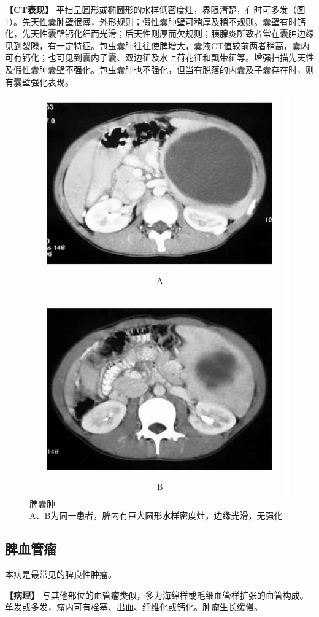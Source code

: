 \textbf{【CT表现】}
平扫呈圆形或椭圆形的水样低密度灶，界限清楚，有时可多发（图\ref{fig14-6}）。先天性囊肿壁很薄，外形规则；假性囊肿壁可稍厚及稍不规则。囊壁有时钙化，先天性囊壁钙化细而光滑；后天性则厚而欠规则；胰腺炎所致者常在囊肿边缘见到裂隙，有一定特征。包虫囊肿往往使脾增大，囊液CT值较前两者稍高，囊内可有钙化；也可见到囊内子囊、双边征及水上荷花征和飘带征等。增强扫描先天性及假性囊肿囊壁不强化。包虫囊肿也不强化，但当有脱落的内囊及子囊存在时，则有囊壁强化表现。

\begin{figure}[!htbp]
 \centering
 \includegraphics[width=.7\textwidth,height=\textheight,keepaspectratio]{./images/Image00314.jpg}
 \captionsetup{justification=centering}
 \caption{脾囊肿\\{\small A、B为同一患者，脾内有巨大圆形水样密度灶，边缘光滑，无强化}}
 \label{fig14-6}
  \end{figure} 

\subsection{脾血管瘤}

本病是最常见的脾良性肿瘤。

\textbf{【病理】}
与其他部位的血管瘤类似，多为海绵样或毛细血管样扩张的血管构成。单发或多发，瘤内可有栓塞、出血、纤维化或钙化。肿瘤生长缓慢。

